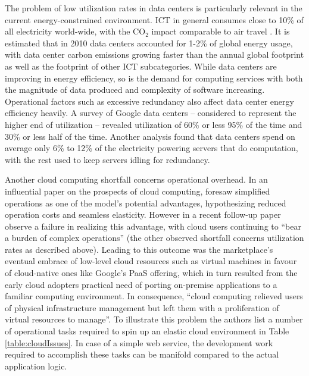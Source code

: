 The problem of low utilization rates in data centers is particularly relevant in the current energy-constrained environment. ICT in general consumes close to 10\% of all electricity world-wide, with the CO$_2$ impact comparable to air travel \parencite{buyya2017manifesto}. It is estimated that in 2010 data centers accounted for 1-2\% of global energy usage, with data center carbon emissions growing faster than the annual global footprint as well as the footprint of other ICT subcategories. While data centers are improving in energy efficiency, so is the demand for computing services with both the magnitude of data produced and complexity of software increasing. Operational factors such as excessive redundancy also affect data center energy efficiency heavily. A survey of Google data centers -- considered to represent the higher end of utilization -- revealed utilization of 60\% or less 95\% of the time and 30\% or less half of the time. Another analysis found that data centers spend on average only 6\% to 12\% of the electricity powering servers that do computation, with the rest used to keep servers idling for redundancy. \parencite{horner16powerusage}

Another cloud computing shortfall concerns operational overhead. In an influential paper on the prospects of cloud computing, \textcite{armbrust09berkeleyView} foresaw simplified operations as one of the model's potential advantages, hypothesizing reduced operation costs and seamless elasticity. However in a recent follow-up paper \textcite{jonas19berkeleyView} observe a failure in realizing this advantage, with cloud users continuing to ``bear a burden of complex operations'' (the other observed shortfall concerns utilization rates as described above). Leading to this outcome was the marketplace's eventual embrace of low-level cloud resources such as virtual machines in favour of cloud-native ones like Google's PaaS offering, which in turn resulted from the early cloud adopters practical need of porting on-premise applications to a familiar computing environment. In consequence, ``cloud computing relieved users of physical infrastructure management but left them with a proliferation of virtual resources to manage''. To illustrate this problem the authors list a number of operational tasks required to spin up an elastic cloud environment in Table \ref{table:cloudIssues}. In case of a simple web service, the development work required to accomplish these tasks can be manifold compared to the actual application logic.

